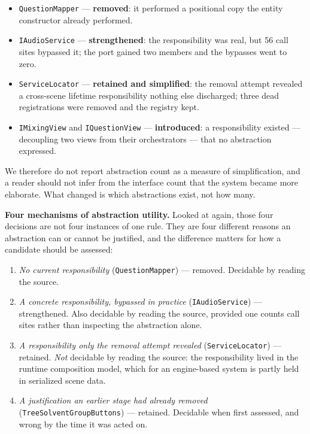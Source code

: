 \documentclass{sbc2019}%
\begin{document}
\begin{itemize}\itemsep2pt
\item \texttt{QuestionMapper} --- \textbf{removed}: it performed a positional
copy the entity constructor already performed.
\item \texttt{IAudioService} --- \textbf{strengthened}: the responsibility was
real, but 56 call sites bypassed it; the port gained two members and the bypasses
went to zero.
\item \texttt{ServiceLocator} --- \textbf{retained and simplified}: the removal
attempt revealed a cross-scene lifetime responsibility nothing else discharged;
three dead registrations were removed and the registry kept.
\item \texttt{IMixingView} and \texttt{IQuestionView} --- \textbf{introduced}:
a responsibility existed --- decoupling two views from their orchestrators --- that
no abstraction expressed.
\end{itemize}

We therefore do not report abstraction count as a measure of simplification, and
a reader should not infer from the interface count that the system became more
elaborate. What changed is which abstractions exist, not how many.

\medskip\noindent\textbf{Four mechanisms of abstraction utility.} Looked at
again, those four decisions are not four instances of one rule. They are four
different reasons an abstraction can or cannot be justified, and the difference
matters for how a candidate should be assessed:

\begin{enumerate}\itemsep2pt
\item \emph{No current responsibility} (\texttt{QuestionMapper}) --- removed.
Decidable by reading the source.
\item \emph{A concrete responsibility, bypassed in practice}
(\texttt{IAudioService}) --- strengthened. Also decidable by reading the source,
provided one counts call sites rather than inspecting the abstraction alone.
\item \emph{A responsibility only the removal attempt revealed}
(\texttt{ServiceLocator}) --- retained. \emph{Not} decidable by reading the
source: the responsibility lived in the runtime composition model, which for an
engine-based system is partly held in serialized scene data.
\item \emph{A justification an earlier stage had already removed}
(\texttt{TreeSolventGroupButtons}) --- retained. Decidable when first assessed,
and wrong by the time it was acted on.
\end{enumerate}
\end{document}

